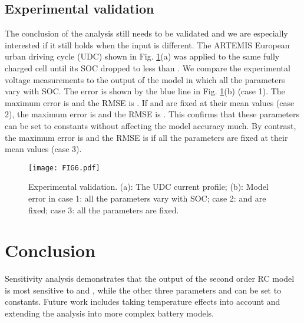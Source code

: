 \documentclass[letterpaper,twocolumn]{IEEEtran}
\begin{document}
\subsection{Experimental validation}


The conclusion of the analysis still needs to be validated and we are especially interested if it still holds when the input is different. The ARTEMIS European urban driving cycle (UDC) \cite{Andre2004} shown in Fig. \ref{fig:Figure6}(a) was applied to the same fully charged cell until its SOC dropped to less than . We compare the experimental voltage measurements to the output of the model in which all the parameters vary with SOC. The error is shown by the blue line in Fig. \ref{fig:Figure6}(b) (case 1). The maximum  error is  and the RMSE is . If  and  are fixed at their mean values (case 2), the maximum  error is  and the RMSE is . This confirms that these parameters can be set to constants without affecting the model accuracy much. By contrast, the maximum  error is  and the RMSE is  if all the parameters are fixed at their mean values (case 3).

\begin{figure}
\centering
\texttt{[image: FIG6.pdf]}
\caption{Experimental validation. (a): The UDC current profile; (b): Model error in case 1: all the parameters vary with SOC; case 2:  and  are fixed; case 3: all the parameters are fixed.}
\label{fig:Figure6}
\end{figure}

\section{Conclusion}
Sensitivity analysis demonstrates that the output of the second order RC model is most sensitive to  and , while the other three parameters  and  can be set to constants. Future work includes taking temperature effects into account and extending the analysis into more complex battery models.
\end{document}
